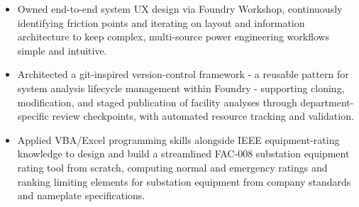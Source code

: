\documentclass[10pt, letterpaper]{article}
\newenvironment{rlist}{%
  \begin{itemize}[leftmargin=1.4em, itemsep=1pt, topsep=2pt, parsep=0pt]%
}{%
  \end{itemize}%
}
\begin{document}
\begin{rlist}
  \item Owned end-to-end system UX design via Foundry Workshop, continuously identifying friction points and iterating on layout and information architecture to keep complex, multi-source power engineering workflows simple and intuitive.
  \item Architected a git-inspired version-control framework - a reusable pattern for system analysis lifecycle management within Foundry - supporting cloning, modification, and staged publication of facility analyses through department-specific review checkpoints, with automated resource tracking and validation.
  \item Applied VBA/Excel programming skills alongside IEEE equipment-rating knowledge to design and build a streamlined FAC-008 substation equipment rating tool from scratch, computing normal and emergency ratings and ranking limiting elements for substation equipment from company standards and nameplate specifications.
\end{rlist}
\end{document}
